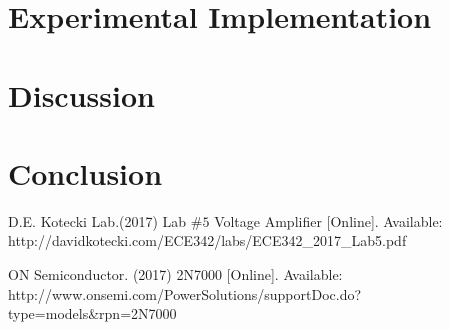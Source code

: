 \documentclass{article}
\begin{document}
 
    
  \section{Experimental Implementation}
  	

    
  \section{Discussion}
     
    
    
    \section{Conclusion}
        

    
    \newpage
\clearpage

\appendix

\begin{thebibliography}{00}

 D.E. Kotecki Lab.(2017) Lab $\#5$ Voltage Amplifier [Online]. Available: http://davidkotecki.com/ECE342/labs/ECE342\_2017\_Lab5.pdf
\newline

 ON Semiconductor. (2017) 2N7000 [Online]. Available: http://www.onsemi.com/PowerSolutions/supportDoc.do?type=models\&rpn=2N7000
\newline


\end{thebibliography}
\end{document}
